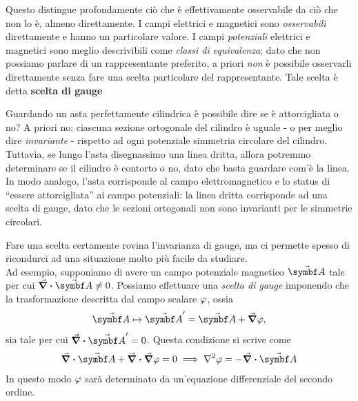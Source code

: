 Questo distingue profondamente ciò che è effettivamente osservabile da ciò che non lo è, almeno direttamente. I campi elettrici e magnetici sono \textit{osservabili} direttamente e hanno un particolare valore. I campi \textit{potenziali} elettrici e magnetici sono meglio descrivibili come \textit{classi di equivalenza}; dato che non possiamo parlare di un rappresentante preferito, a priori \textit{non} è possibile osservarli direttamente senza fare una scelta particolare del rappresentante. Tale scelta è detta \textbf{scelta di gauge}
\begin{intuit}
	Guardando un asta perfettamente cilindrica è possibile dire se è attorcigliata o no? A priori no: ciascuna sezione ortogonale del cilindro è uguale - o per meglio dire \textit{invariante} - rispetto ad ogni potenziale simmetria circolare del cilindro. Tuttavia, se lungo l'asta disegnassimo una linea dritta, allora potremmo determinare se il cilindro è contorto o no, dato che basta guardare com'è la linea.\\
	In modo analogo, l'asta corrisponde al campo elettromagnetico e lo status di ``essere attorcigliata'' ai campo potenziali: la linea dritta corrisponde ad una scelta di gauge, dato che le sezioni ortogonali non sono invarianti per le simmetrie circolari.
\end{intuit}
\noindent Fare una scelta certamente rovina l'invarianza di gauge, ma ci permette spesso di ricondurci ad una situazione molto più facile da studiare.\\
Ad esempio, supponiamo di avere un campo potenziale magnetico $\vba{A}$ tale per cui $\div{\vba{A}}\neq 0$. Possiamo effettuare una \textit{scelta di gauge} imponendo che la trasformazione descritta dal campo scalare $\oldphi$, ossia
\begin{equation*}
	\vba{A}\mapsto\vba{A}'=\vba{A}+\grad{\oldphi},
\end{equation*}
sia tale per cui $\div{\vba{A}'}=0$. Questa condizione si scrive come
\begin{gather*}
	\div\vba{A}+\div\grad\oldphi=0 \implies \laplacian\oldphi= -\div\vba{A}
\end{gather*}
In questo modo $\oldphi$ sarà determinato da un'equazione differenziale del secondo ordine.

